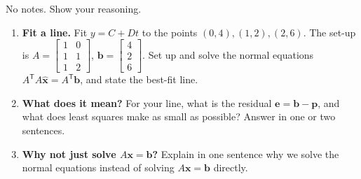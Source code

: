 \documentclass[10pt]{article}
\newcommand{\xx}{\mathbf{x}}
\newcommand{\bb}{\mathbf{b}}
\newcommand{\pp}{\mathbf{p}}
\newcommand{\ee}{\mathbf{e}}
\newcommand{\T}{\mathsf{T}}
\begin{document}
\namedateperiod

\vspace{0.15in}

No notes. Show your reasoning.

\begin{enumerate}[leftmargin=1.8em, itemsep=15pt]
  \item \textbf{Fit a line.} Fit $y=C+Dt$ to the points $(0,4),(1,2),(2,6)$. The set-up is
        $A=\begin{bmatrix} 1&0\\ 1&1\\ 1&2 \end{bmatrix}$, $\bb=\begin{bmatrix} 4\\2\\6 \end{bmatrix}$.
        Set up and solve the normal equations $A^{\T}A\hat{\xx}=A^{\T}\bb$, and state the best-fit line.
        \vspace{2.2cm}
  \item \textbf{What does it mean?} For your line, what is the residual $\ee=\bb-\pp$, and what does least
        squares make as small as possible? Answer in one or two sentences.
  \item \textbf{Why not just solve $A\xx=\bb$?} Explain in one sentence why we solve the normal equations
        instead of solving $A\xx=\bb$ directly.
\end{enumerate}
\end{document}
